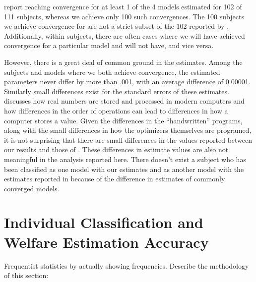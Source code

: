 \documentclass[../main.tex]{subfiles}
\begin{document}
\textcite{Harrison2016} report reaching convergence for at least 1 of the 4 models estimated for 102 of 111 subjects, whereas we achieve only 100 such convergences.
The 100 subjects we achieve convergence for are not a strict subset of the 102 reported by \textcite{Harrison2016}.
Additionally, within subjects, there are often cases where we will have achieved convergence for a particular model and \textcite{Harrison2016} will not have, and vice versa.

However, there is a great deal of common ground in the estimates.
Among the subjects and models where we both achieve convergence, the estimated parameters never differ by more than .001, with an average difference of 0.00001.
Similarly small differences exist for the standard errors of these estimates.
\textcite{Gould2006} discusses how real numbers are stored and processed in modern computers and how differences in the order of operations can lead to differences in how a computer stores a value.
Given the differences in the \enquote{handwritten} programs, along with the small differences in how the optimizers themselves are programed, it is not surprising that there are small differences in the values reported between our results and those of \textcite{Harrison2016}.
These differences in estimate values are also not meaningful in the analysis reported here.
There doesn't exist a subject who has been classified as one model with our estimates and as another model with the estimates reported in \textcite{Harrison2016} because of the difference in estimates of commonly converged models.

\addtocounter{footnote}{-1}




\section{Individual Classification and Welfare Estimation Accuracy}
	Frequentist statistics by actually showing frequencies.
	Describe the methodology of this section:
\end{document}
